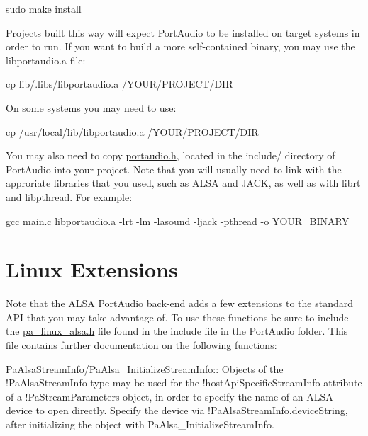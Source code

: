 \begin{DoxyCode}
sudo make install
\end{DoxyCode}


Projects built this way will expect Port\+Audio to be installed on target systems in order to run. If you want to build a more self-\/contained binary, you may use the libportaudio.\+a file\+:


\begin{DoxyCode}
cp lib/.libs/libportaudio.a /YOUR/PROJECT/DIR
\end{DoxyCode}


On some systems you may need to use\+:


\begin{DoxyCode}
cp /usr/local/lib/libportaudio.a /YOUR/PROJECT/DIR
\end{DoxyCode}


You may also need to copy \hyperlink{portaudio_8h}{portaudio.\+h}, located in the include/ directory of Port\+Audio into your project. Note that you will usually need to link with the approriate libraries that you used, such as A\+L\+SA and J\+A\+CK, as well as with librt and libpthread. For example\+:


\begin{DoxyCode}
gcc \hyperlink{elements_8c_a0ddf1224851353fc92bfbff6f499fa97}{main}.c libportaudio.a -lrt -lm -lasound -ljack -pthread -\hyperlink{namespacesmartmsgmerge_aba35baca6a2a8d4f665ba30724f4739a}{o} YOUR\_BINARY
\end{DoxyCode}
\hypertarget{compile_linux_comp_linux4}{}\section{Linux Extensions}\label{compile_linux_comp_linux4}
Note that the A\+L\+SA Port\+Audio back-\/end adds a few extensions to the standard A\+PI that you may take advantage of. To use these functions be sure to include the \hyperlink{pa__linux__alsa_8h}{pa\+\_\+linux\+\_\+alsa.\+h} file found in the include file in the Port\+Audio folder. This file contains further documentation on the following functions\+:

Pa\+Alsa\+Stream\+Info/\+Pa\+Alsa\+\_\+\+Initialize\+Stream\+Info\+:\+: Objects of the !\+Pa\+Alsa\+Stream\+Info type may be used for the !host\+Api\+Specific\+Stream\+Info attribute of a !\+Pa\+Stream\+Parameters object, in order to specify the name of an A\+L\+SA device to open directly. Specify the device via !\+Pa\+Alsa\+Stream\+Info.device\+String, after initializing the object with Pa\+Alsa\+\_\+\+Initialize\+Stream\+Info.

